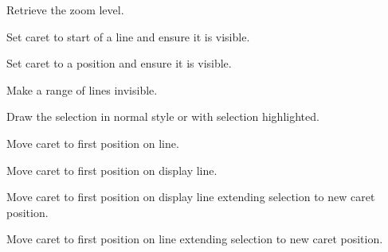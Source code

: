
Retrieve the zoom level.


\label{wxstyledtextctrlgotoline}


Set caret to start of a line and ensure it is visible.


\label{wxstyledtextctrlgotopos}


Set caret to a position and ensure it is visible.


\label{wxstyledtextctrlhidelines}


Make a range of lines invisible.


\label{wxstyledtextctrlhideselection}


Draw the selection in normal style or with selection highlighted.


\label{wxstyledtextctrlhome}


Move caret to first position on line.


\label{wxstyledtextctrlhomedisplay}


Move caret to first position on display line.


\label{wxstyledtextctrlhomedisplayextend}


Move caret to first position on display line extending selection to
new caret position.


\label{wxstyledtextctrlhomeextend}


Move caret to first position on line extending selection to new caret position.


\label{wxstyledtextctrlhomerectextend}

